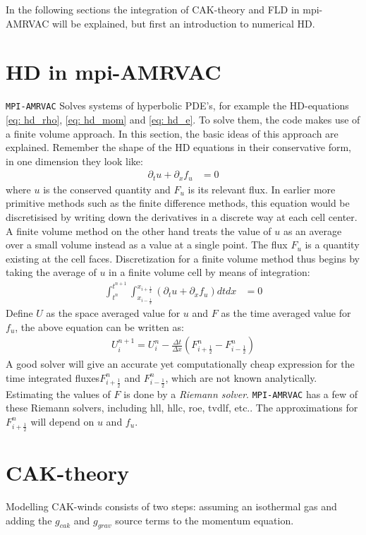In the following sections the integration of CAK-theory and FLD in mpi-AMRVAC will be explained, but first an introduction to numerical HD.


\section{HD in mpi-AMRVAC}
\texttt{MPI-AMRVAC} Solves systems of hyperbolic PDE's, for example the HD-equations \eqref{eq: hd_rho}, \eqref{eq: hd_mom} and \eqref{eq: hd_e}. To solve them, the code makes use of a finite volume approach. In this section, the basic ideas of this approach are explained. Remember the shape of the HD equations in their conservative form, in one dimension they look like:
\begin{align}
\partial_t u + \partial_x f_u &= 0 \label{eq: cons form}
\end{align}
where $u$ is the conserved quantity and $F_u$ is its relevant flux. In earlier more primitive methods such as the finite difference methods, this equation would be discretisised by writing down the derivatives in a discrete way at each cell center. A finite volume method on the other hand treats the value of $u$ as an average over a small volume instead as a value at a single point. The flux $F_u$ is a quantity existing at the cell faces. Discretization for a finite volume method thus begins by taking the average of $u$ in a finite volume cell by means of integration:
\begin{align} 
\int_{t^n}^{t^{n+1}} \int_{x_{i-\frac{1}{2}}}^{x_{i+\frac{1}{2}}} \left( \partial_t u + \partial_x f_u \right) dt dx &= 0 
\end{align}
Define $U$ as the space averaged value for $u$ and $F$ as the time averaged value for $f_u$, the above equation can be written as:
\begin{align}
U^{n+1}_i = U^n_i - \frac{\Delta t}{\Delta x}\left(F^n_{i+\frac{1}{2}} - F^n_{i-\frac{1}{2}} \right) 
\end{align}
A good solver will give an accurate yet computationally cheap expression for the time integrated fluxes$F^n_{i+\frac{1}{2}}$ and $F^n_{i-\frac{1}{2}}$, which are not known analytically. Estimating the values of $F$ is done by a \emph{Riemann solver}. \texttt{MPI-AMRVAC} has a few of these Riemann solvers, including  hll, hllc, roe, tvdlf, etc.. The approximations for $F^n_{i+\frac{1}{2}}$ will depend on $u$ and $f_u$.\\ 

\section{CAK-theory}
Modelling CAK-winds consists of two steps: assuming an isothermal gas and adding the $g_{cak}$ and $g_{grav}$ source terms to the momentum equation.

